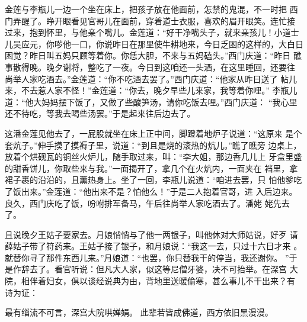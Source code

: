 金莲与李瓶儿一边一个坐在床上，把孩子放在他面前，怎禁的鬼混，不一时把
西门弄醒了。睁开眼看见官哥儿在面前，穿着道士衣服，喜欢的眉开眼笑。连忙接
过来，抱到怀里，与他亲个嘴儿。金莲道：“好干净嘴头子，就来亲孩儿！小道士
儿吴应元，你哕他一口，你说昨日在那里使牛耕地来，今日乏困的这样的，大白日
困觉？昨日叫五妈只顾等着你。你恁大胆，不来与五妈磕头。”西门庆道：“昨日
醮事散得晚。晚夕谢将，整吃了一夜。今日到这咱还一头酒，在这里睡回，还要往
尚举人家吃酒去。”金莲道：“你不吃酒去罢了。”西门庆道：“他家从昨日送了
帖儿来，不去惹人家不怪！”金莲道：“你去，晚夕早些儿来家，我等着你哩。”
李瓶儿道：“他大妈妈摆下饭了，又做了些酸笋汤，请你吃饭去哩。”西门庆道：
“我心里还不待吃，等我去喝些汤罢。”于是起来往后边去了。

这潘金莲见他去了，一屁股就坐在床上正中间，脚蹬着地炉子说道：“这原来
是个套炕子。”伸手摸了摸褥子里，说道：“到且是烧的滚热的炕儿。”瞧了瞧旁
边桌上，放着个烘砚瓦的铜丝火炉儿，随手取过来，叫：“李大姐，那边香几儿上
牙盒里盛的甜香饼儿，你取些来与我。”一面揭开了，拿几个在火炕内，一面夹在
裆里，拿裙子裹的沿沿的，且薰热身上。坐了一回，李瓶儿说道：“咱进去罢，只
怕他爹吃了饭出来。”金莲道：“他出来不是？怕他么！”于是二人抱着官哥，进
入后边来。良久，西门庆吃了饭，吩咐排军备马，午后往尚举人家吃酒去了。潘姥
姥先去了。

且说晚夕王姑子要家去。月娘悄悄与了他一两银子，叫他休对大师姑说，好歹
请薛姑子带了符药来。王姑子接了银子，和月娘说：“我这一去，只过十六日才来
。就替你寻了那件东西儿来。”月娘道：“也罢，你只替我干的停当，我还谢你。
”于是作辞去了。看官听说：但凡大人家，似这等尼僧牙婆，决不可抬举。在深宫
大院，相伴着妇女，俱以谈经说典为由，背地里送暖偷寒，甚么事儿不干出来？有
诗为证：

最有缁流不可言，深宫大院哄婵娟。
此辈若皆成佛道，西方依旧黑漫漫。

